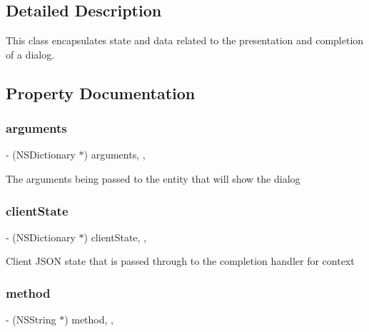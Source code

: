 \subsection{Detailed Description}
This class encapsulates state and data related to the presentation and completion of a dialog. 

\subsection{Property Documentation}
\mbox{\label{interfaceFBDialogsData_a684b1d6b5e6e1ee3015d639228ed3078}} 
\subsubsection{\texorpdfstring{arguments}{arguments}}
{\footnotesize\ttfamily -\/ (N\+S\+Dictionary $\ast$) arguments\hspace{0.3cm}{\ttfamily [read]}, {\ttfamily [nonatomic]}, {\ttfamily [assign]}}

The arguments being passed to the entity that will show the dialog \mbox{\label{interfaceFBDialogsData_a6de7147941c70c1f49913d983169c6ea}} 
\subsubsection{\texorpdfstring{client\+State}{clientState}}
{\footnotesize\ttfamily -\/ (N\+S\+Dictionary $\ast$) client\+State\hspace{0.3cm}{\ttfamily [read]}, {\ttfamily [nonatomic]}, {\ttfamily [assign]}}

Client J\+S\+ON state that is passed through to the completion handler for context \mbox{\label{interfaceFBDialogsData_a4f43aa8789a85f189816638f3ae26d3d}} 
\subsubsection{\texorpdfstring{method}{method}}
{\footnotesize\ttfamily -\/ (N\+S\+String $\ast$) method\hspace{0.3cm}{\ttfamily [read]}, {\ttfamily [nonatomic]}, {\ttfamily [assign]}}

